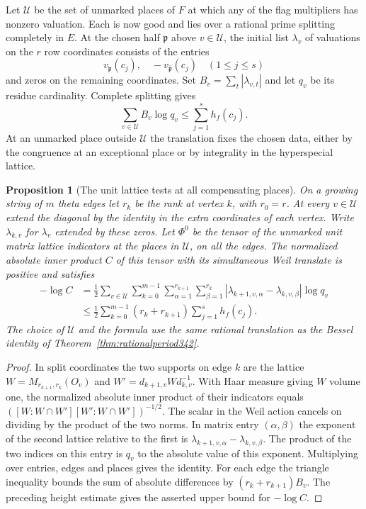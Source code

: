 \documentclass[a4paper,11pt]{article}
\newtheorem{proposition}{Proposition}[section]
\theoremstyle{definition}
\theoremstyle{remark}
\numberwithin{equation}{section}
\begin{document}
Let $\mathcal U$ be the set of unmarked places of $F$ at which any
of the flag multipliers has nonzero valuation. Each is now good
and lies over a rational prime splitting completely in $E$.
At the chosen half $\mathfrak p$ above $v\in\mathcal U$, the
initial list $\lambda_v$ of valuations on the $r$ row coordinates
consists of the entries
\[
      v_{\mathfrak p}(c_j),\quad -v_{\bar{\mathfrak p}}(c_j)
                          \quad (1\le j\le s)
\]
and zeros on the remaining coordinates. Set $B_v=\sum_t|\lambda_{v,t}|$
and let $q_v$ be its residue cardinality. Complete splitting gives
\[
                   \sum_{v\in\mathcal U}B_v\log q_v
                                  \le \sum_{j=1}^s h_f(c_j).
\]
At an unmarked place outside $\mathcal U$ the translation fixes the
chosen data, either by the congruence at an exceptional place or by
integrality in the hyperspecial lattice.

\begin{proposition}[The unit lattice tests at all compensating places]\leavevmode\label{prop:unmarkedscore343}
On a growing string of $m$ theta edges let $r_k$ be the rank at
vertex $k$, with $r_0=r$. At every $v\in\mathcal U$ extend the
diagonal by the identity in the extra coordinates of each vertex.
Write $\lambda_{k,v}$ for $\lambda_v$ extended by these zeros.
Let $\Phi^0$ be the tensor of the unmarked unit matrix lattice
indicators at the places in $\mathcal U$, on all the edges.
The normalized absolute inner product $C$ of this tensor with its
simultaneous Weil translate is positive and satisfies
\[
 \begin{aligned}
 -\log C
 &=\tfrac12\sum_{v\in\mathcal U}\sum_{k=0}^{m-1}
       \sum_{\alpha=1}^{r_{k+1}}\sum_{\beta=1}^{r_k}
       |\lambda_{k+1,v,\alpha}-\lambda_{k,v,\beta}|\log q_v\\
 &\le \tfrac12\sum_{k=0}^{m-1}(r_k+r_{k+1})
                              \sum_{j=1}^s h_f(c_j).
 \end{aligned}
\]
The choice of $\mathcal U$ and the formula use the same rational
translation as the Bessel identity of Theorem~\ref{thm:rationalperiod342}.
\end{proposition}
\begin{proof}
In split coordinates the two supports on edge $k$ are the lattice
$W=M_{r_{k+1},r_k}(O_v)$ and $W'=d_{k+1,v}W d_{k,v}^{-1}$.
With Haar measure giving $W$ volume one, the normalized absolute
inner product of their indicators equals
$([W:W\cap W'][W':W\cap W'])^{-1/2}$. The scalar in the Weil
action cancels on dividing by the product of the two norms. In
matrix entry $(\alpha,\beta)$ the exponent of the second lattice
relative to the first is
$\lambda_{k+1,v,\alpha}-\lambda_{k,v,\beta}$. The product of the
two indices on this entry is $q_v$ to the absolute value of this
exponent. Multiplying over entries, edges and places gives the identity.
For each edge the triangle inequality bounds the sum of absolute
differences by $(r_k+r_{k+1})B_v$. The preceding height estimate
gives the asserted upper bound for $-\log C$.
\end{proof}
\end{document}
